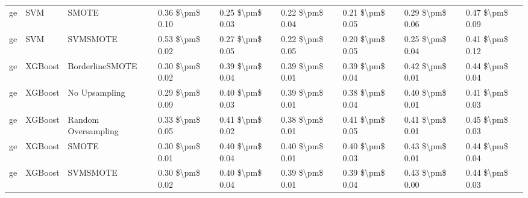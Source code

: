 \begin{tabular}{lllllllll}
      ge &                             SVM &                         SMOTE &     0.36 \$\textbackslash pm\$ 0.10 &           0.25 \$\textbackslash pm\$ 0.03 &       0.22 \$\textbackslash pm\$ 0.04 &        0.21 \$\textbackslash pm\$ 0.05 &                         0.29 \$\textbackslash pm\$ 0.06 &     0.47 \$\textbackslash pm\$ 0.09 \\
      ge &                             SVM &                      SVMSMOTE &     0.53 \$\textbackslash pm\$ 0.02 &           0.27 \$\textbackslash pm\$ 0.05 &       0.22 \$\textbackslash pm\$ 0.05 &        0.20 \$\textbackslash pm\$ 0.05 &                         0.25 \$\textbackslash pm\$ 0.04 &     0.41 \$\textbackslash pm\$ 0.12 \\
      ge &                         XGBoost &               BorderlineSMOTE &     0.30 \$\textbackslash pm\$ 0.02 &           0.39 \$\textbackslash pm\$ 0.04 &       0.39 \$\textbackslash pm\$ 0.01 &        0.39 \$\textbackslash pm\$ 0.04 &                         0.42 \$\textbackslash pm\$ 0.01 &     0.44 \$\textbackslash pm\$ 0.04 \\
      ge &                         XGBoost &                 No Upsampling &     0.29 \$\textbackslash pm\$ 0.09 &           0.40 \$\textbackslash pm\$ 0.03 &       0.39 \$\textbackslash pm\$ 0.01 &        0.38 \$\textbackslash pm\$ 0.04 &                         0.40 \$\textbackslash pm\$ 0.01 &     0.41 \$\textbackslash pm\$ 0.03 \\
      ge &                         XGBoost &           Random Oversampling &     0.33 \$\textbackslash pm\$ 0.05 &           0.41 \$\textbackslash pm\$ 0.02 &       0.38 \$\textbackslash pm\$ 0.01 &        0.41 \$\textbackslash pm\$ 0.05 &                         0.41 \$\textbackslash pm\$ 0.01 &     0.45 \$\textbackslash pm\$ 0.03 \\
      ge &                         XGBoost &                         SMOTE &     0.30 \$\textbackslash pm\$ 0.01 &           0.40 \$\textbackslash pm\$ 0.04 &       0.40 \$\textbackslash pm\$ 0.01 &        0.40 \$\textbackslash pm\$ 0.03 &                         0.43 \$\textbackslash pm\$ 0.01 &     0.44 \$\textbackslash pm\$ 0.04 \\
      ge &                         XGBoost &                      SVMSMOTE &     0.30 \$\textbackslash pm\$ 0.02 &           0.40 \$\textbackslash pm\$ 0.04 &       0.39 \$\textbackslash pm\$ 0.01 &        0.39 \$\textbackslash pm\$ 0.04 &                         0.43 \$\textbackslash pm\$ 0.00 &     0.44 \$\textbackslash pm\$ 0.03 \\

\end{tabular}

